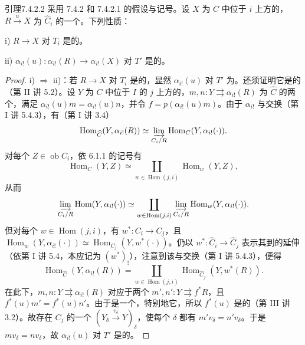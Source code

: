\begin{SGAresult}{引理}{7.4.2.2}
采用 7.4.2 和 7.4.2.1 的假设与记号。设 $X$ 为 $C$ 中位于 $i$ 上方的，$R\xrightarrow uX$ 为 $\widehat C_i$ 的一个。下列性质：

i) $R\to X$ 对 $T_i$ 是的。

ii) $\alpha_{i!}(u):\alpha_{i!}(R)\to\alpha_{i!}(X)$ 对 $T'$ 是的。
\end{SGAresult}
\begin{proof}
i) $\Rightarrow$ ii)：若 $R\to X$ 对 $T_i$ 是的，显然 $\alpha_{i!}(u)$ 对 $T'$ 为。还须证明它是的（第 II 讲 5.2）。设 $Y$ 为 $C$ 中位于 $I$ 的 $j$ 上方的，$m,n:Y\rightrightarrows\alpha_{i!}(R)$ 为 $\widehat C$ 的两个，满足
$\alpha_{i!}(u)m=\alpha_{i!}(u)n$，并令 $f=p(\alpha_{i!}(u)m)$。由于 $\alpha_{i!}$ 与交换（第 I 讲 5.4.3），有（第 I 讲 3.4）
\[\operatorname{Hom}_{\widehat C}(Y,\alpha_{i!}(R))\simeq\varinjlim_{C_i/R}\operatorname{Hom}_C(Y,\alpha_{i!}(\cdot)).\]
对每个 $Z\in\operatorname{ob}C_i$，依 6.1.1 的记号有
\[\operatorname{Hom}_C(Y,Z)\simeq\coprod_{w\in\operatorname{Hom}(j,i)}\operatorname{Hom}_w(Y,Z),\]
从而
\[\varinjlim_{C_i/R}\operatorname{Hom}(Y,\alpha_{i!}(\cdot))\simeq\coprod_{w\in\operatorname{Hom}(j,i)}\varinjlim_{C_i/R}\operatorname{Hom}_w(Y,\alpha_{i!}(\cdot)).\]
但对每个 $w\in\operatorname{Hom}(j,i)$，有 $w^*:C_i\to C_j$，且 $\operatorname{Hom}_w(Y,\alpha_{i!}(\cdot))\simeq\operatorname{Hom}_{C_j}(Y,w^*(\cdot))$。仍以 $w^*:\widehat C_i\to\widehat C_j$ 表示其到的延伸（依第 I 讲 5.4，本应记为 $(w^*)_!$），注意到该与交换（第 I 讲 5.4.3），便得
\[\operatorname{Hom}_{\widehat C}(Y,\alpha_{i!}(R))=\coprod_{w\in\operatorname{Hom}(j,i)}\operatorname{Hom}_{\widehat C_j}(Y,w^*(R)).\]
在此下，$m,n:Y\rightrightarrows\alpha_{i!}(R)$ 对应于两个 $m',n':Y\rightrightarrows f^*R$，且 $f^*(u)m'=f^*(u)n'$。由于是一个，特别地它，所以 $f^*(u)$ 是的（第 III 讲 3.2）。故存在 $C_j$ 的一个 $(Y_\delta\xrightarrow{v_\delta}Y)_\delta$，使每个 $\delta$ 都有 $m'v_\delta=n'v_\delta$。于是 $mv_\delta=nv_\delta$，故 $\alpha_{i!}(u)$ 对 $T'$ 是的。


\end{proof}
